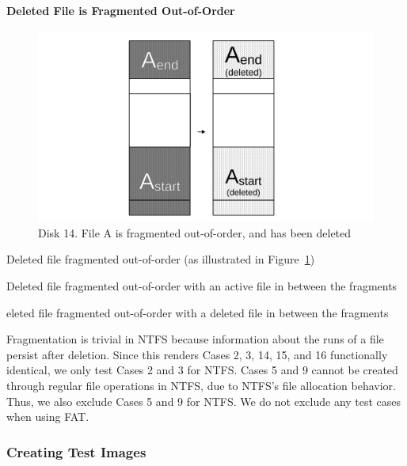 \paragraph{Deleted File is Fragmented Out-of-Order}
\begin{arabiclist}
\setcounter{enumi}{13}
    \begin{figure}[h]
        \centering
        \includegraphics[width=\linewidth]{fig/case14.pdf}
        \caption{Disk 14. File A is fragmented out-of-order, and has been deleted}
        \label{fig:case14}
    \end{figure}
    \item Deleted file fragmented out-of-order (as illustrated in Figure~\ref{fig:case14})
    \item Deleted file fragmented out-of-order with an active file in between the fragments
    \item eleted file fragmented out-of-order with a deleted file in between the fragments
\end{arabiclist}



Fragmentation is trivial in NTFS because information about the runs of a file persist after deletion.
Since this renders Cases 2, 3, 14, 15, and 16 functionally identical, we only test Cases 2 and 3 for NTFS.
Cases 5 and 9 cannot be created through regular file operations in NTFS, due to NTFS's file allocation behavior.
Thus, we also exclude Cases 5 and 9 for NTFS.
We do not exclude any test cases when using FAT.


\subsubsection{Creating Test Images}

